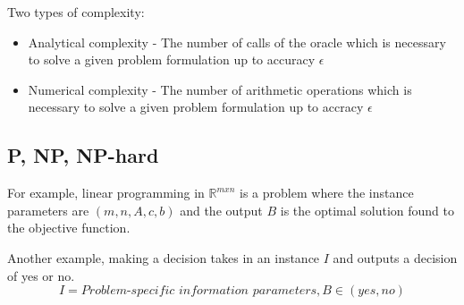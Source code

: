 Two types of complexity:
\begin{itemize}
  \item Analytical complexity - The number of calls of the oracle which is necessary to solve a given problem formulation up to accuracy $\epsilon$
  \item Numerical complexity - The number of arithmetic operations which is necessary to solve a given problem formulation up to accracy $\epsilon$
\end{itemize}

\subsection{P, NP, NP-hard}

For example, linear programming in $\mathbb{R}^{mxn}$ is a problem where the instance parameters are $(m,n,A,c,b)$ and the output $B$ is the optimal solution found to the objective function.

Another example, making a decision takes in an instance $I$ and outputs a decision of yes or no.
\begin{equation}
  I = \textit{Problem-specific information parameters}, B \in (yes, no)
\end{equation}

